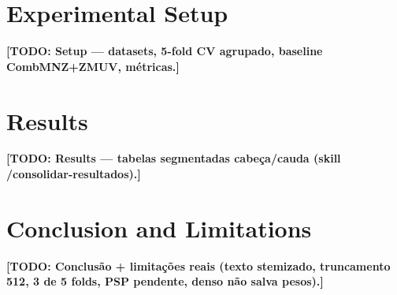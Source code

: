 \documentclass[sigconf,nonacm]{acmart}
\newcommand{\todo}[1]{\textbf{[TODO: #1]}}
\begin{document}
\section{Experimental Setup}
\todo{Setup — datasets, 5-fold CV agrupado, baseline CombMNZ+ZMUV, métricas.}

\section{Results}
\todo{Results — tabelas segmentadas cabeça/cauda (skill /consolidar-resultados).}

\section{Conclusion and Limitations}
\todo{Conclusão + limitações reais (texto stemizado, truncamento 512, 3 de 5 folds,
PSP pendente, denso não salva pesos).}



\end{document}
